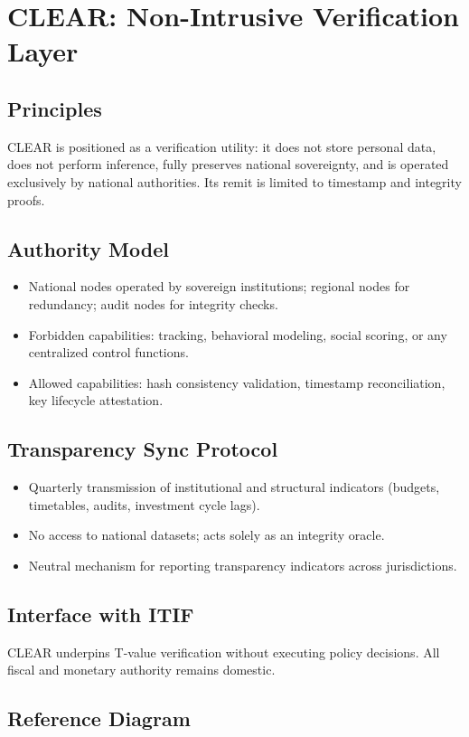 \section{CLEAR: Non-Intrusive Verification Layer}
\subsection{Principles}
CLEAR is positioned as a verification utility: it does not store personal data, does not perform inference, fully preserves national sovereignty, and is operated exclusively by national authorities. Its remit is limited to timestamp and integrity proofs.

\subsection{Authority Model}
\begin{itemize}
  \item National nodes operated by sovereign institutions; regional nodes for redundancy; audit nodes for integrity checks.
  \item Forbidden capabilities: tracking, behavioral modeling, social scoring, or any centralized control functions.
  \item Allowed capabilities: hash consistency validation, timestamp reconciliation, key lifecycle attestation.
\end{itemize}

\subsection{Transparency Sync Protocol}
\begin{itemize}
  \item Quarterly transmission of institutional and structural indicators (budgets, timetables, audits, investment cycle lags).
  \item No access to national datasets; acts solely as an integrity oracle.
  \item Neutral mechanism for reporting transparency indicators across jurisdictions.
\end{itemize}

\subsection{Interface with ITIF}
CLEAR underpins T-value verification without executing policy decisions. All fiscal and monetary authority remains domestic.

\subsection{Reference Diagram}
